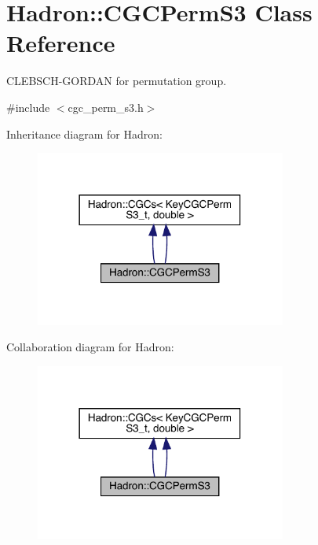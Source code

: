 \hypertarget{classHadron_1_1CGCPermS3}{}\section{Hadron\+:\+:C\+G\+C\+Perm\+S3 Class Reference}
\label{classHadron_1_1CGCPermS3}


C\+L\+E\+B\+S\+C\+H-\/\+G\+O\+R\+D\+AN for permutation group.  




{\ttfamily \#include $<$cgc\+\_\+perm\+\_\+s3.\+h$>$}



Inheritance diagram for Hadron\+:\nopagebreak
\begin{figure}[H]
\begin{center}
\leavevmode
\includegraphics[width=234pt]{d7/d7f/classHadron_1_1CGCPermS3__inherit__graph}
\end{center}
\end{figure}


Collaboration diagram for Hadron\+:\nopagebreak
\begin{figure}[H]
\begin{center}
\leavevmode
\includegraphics[width=234pt]{de/dcc/classHadron_1_1CGCPermS3__coll__graph}
\end{center}
\end{figure}
